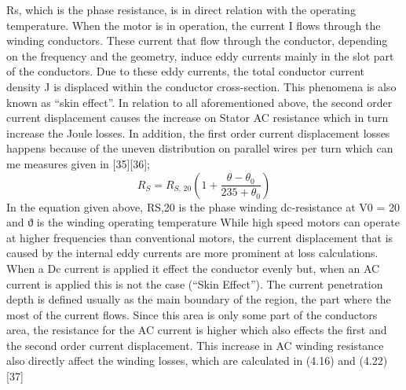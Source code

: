 Rs, which is the phase resistance, is in direct relation with the operating temperature.
When the motor is in operation, the current I flows through the winding conductors.
These current that flow through the conductor, depending on the frequency and the
geometry, induce eddy currents mainly in the slot part of the conductors. Due to
these eddy currents, the total conductor current density J is displaced within the
conductor cross-section. This phenomena is also known as “skin effect”. In relation
to all aforementioned above, the second order current displacement causes the
increase on Stator AC resistance which in turn increase the Joule losses. In addition,
the first order current displacement losses happens because of the uneven distribution
on parallel wires per turn which can me measures given in [35][36];
%
\begin{equation}\label{eq:mag-14}
  R_{S} =
  R_{S,\,20}
  \left(1 + \frac{\theta - \theta_{0}}{235 + \theta_{0}}\right)
\end{equation}
%
In the equation given above, RS,20 is the phase winding dc-resistance at V0 = 20 and ϑ
is the winding operating temperature
%
%
While high speed motors can operate at higher frequencies than conventional motors,
the current displacement that is caused by the internal eddy currents are more
prominent at loss calculations. When a Dc current is applied it effect the conductor
evenly but, when an AC current is applied this is not the case (“Skin Effect”). The
current penetration depth is defined usually as the main boundary of the region, the
part where the most of the current flows. Since this area is only some part of the
conductors area, the resistance for the AC current is higher which also effects the
first and the second order current displacement. This increase in AC winding
resistance also directly affect the winding losses, which are calculated in (4.16) and
(4.22) [37]
%
%
